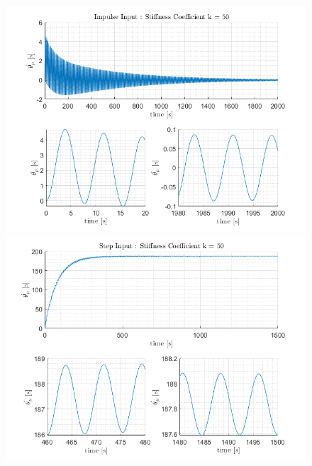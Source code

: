 \documentclass[letterpaper,12pt]{article}
\begin{document}
\begin{figure}[ht]
    \centering
    \includegraphics[scale = .8]{Images/Impulse_k50.png}
    \includegraphics[scale = .8]{Images/StepInput_k50.png}
\end{figure}
\end{document}
